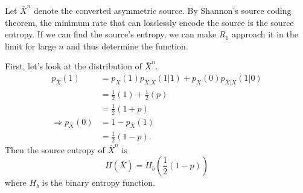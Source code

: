 \documentclass[
  coursecode={MTHE 477},
  assignmentname={Homework \homeworknumber},
  studentnumber=20053722,
  name={Bryan Hoang},
  draft,
]{
  ltxanswer%
}
\begin{document}
  \begin{questions}
    \setcounter{question}{\questionnumber}
    \addtocounter{question}{-1}
    \question[25]\
    \begin{parts}
      \part{}
      \begin{solution}
        Let \(\bar{X}^{n}\) denote the converted asymmetric source. By Shannon's source coding theorem, the minimum rate that can losslessly encode the source is the source entropy. If we can find the source's entropy, we can make \(R_{1}\) approach it in the limit for large \(n\) and thus determine the function.

        First, let's look at the distribution of \(\bar{X}^{n}\).
        \begin{align*}
          p_{\bar{X}}(1)             &= p_{X}(1) p_{\bar{X}|X}(1|1) + p_{X}(0) p_{\bar{X}|X}(1|0) \\
                                     &= \frac{1}{2}(1) + \frac{1}{2}(p)                           \\
                                     &= \frac{1}{2}(1 + p)                                        \\
          \Rightarrow p_{\bar{X}}(0) &= 1 - p_{\bar{X}}(1)                                        \\
                                     &=\frac{1}{2}(1 - p).
        \end{align*}
        Then the source entropy of \(\bar{X}^{n}\) is
        \begin{equation*}\label{eq:binary-entropy}
          H(\bar{X}) = H_{b}(\frac{1}{2}(1-p))
        \end{equation*}
        where \(H_{b}\) is the binary entropy function.


\end{solution}
\end{parts}
\end{questions}
\end{document}
